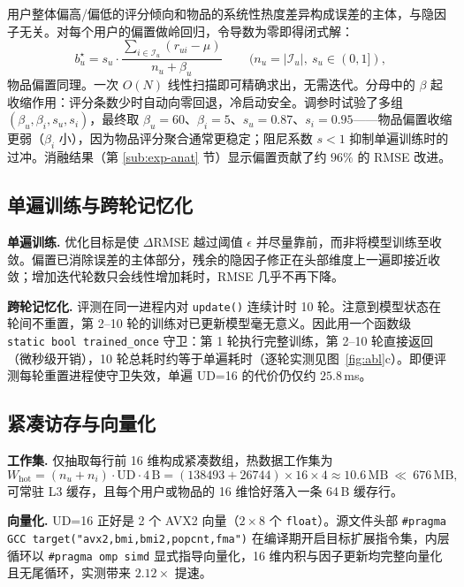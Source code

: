 \documentclass[UTF8,a4paper,10pt]{ctexart}
\newcommand{\nTimeMs}{25.8}          %
\newcommand{\nBiasPct}{96}           %
\newcommand{\nSimdSpeed}{2.12}
\begin{document}
用户整体偏高/偏低的评分倾向和物品的系统性热度差异构成误差的主体，与隐因子无关。对每个用户的偏置做岭回归，令导数为零即得闭式解：
\begin{equation}
  \boxed{\,b_u^\star = s_u\cdot\frac{\displaystyle\sum_{i\in\mathcal{I}_u}(r_{ui}-\mu)}{\,n_u+\beta_u\,}\,}
  \qquad (n_u=|\mathcal{I}_u|,\ s_u\in(0,1]),
  \label{eq:shrink}
\end{equation}
物品偏置同理。一次 $O(N)$ 线性扫描即可精确求出，无需迭代。分母中的 $\beta$ 起收缩作用：评分条数少时自动向零回退，冷启动安全。调参时试验了多组 $(\beta_u, \beta_i, s_u, s_i)$，最终取 $\beta_u{=}60$、$\beta_i{=}5$、$s_u{=}0.87$、$s_i{=}0.95$——物品偏置收缩更弱（$\beta_i$ 小），因为物品评分聚合通常更稳定；阻尼系数 $s<1$ 抑制单遍训练时的过冲。消融结果（第 \ref{sub:exp-anat} 节）显示偏置贡献了约 $\nBiasPct\%$ 的 RMSE 改进。


\subsection{单遍训练与跨轮记忆化}\label{sub:memo}

\textbf{单遍训练.} 优化目标是使 $\Delta\mathrm{RMSE}$ 越过阈值 $\epsilon$ 并尽量靠前，而非将模型训练至收敛。偏置已消除误差的主体部分，残余的隐因子修正在头部维度上一遍即接近收敛；增加迭代轮数只会线性增加耗时，RMSE 几乎不再下降。

\textbf{跨轮记忆化.} 评测在同一进程内对 \texttt{update()} 连续计时 10 轮。注意到模型状态在轮间不重置，第 2--10 轮的训练对已更新模型毫无意义。因此用一个函数级 \texttt{static bool trained\_once} 守卫：第 1 轮执行完整训练，第 2--10 轮直接返回（微秒级开销），10 轮总耗时约等于单遍耗时（逐轮实测见图~\ref{fig:abl}c）。即便评测每轮重置进程使守卫失效，单遍 UD=16 的代价仍仅约 $\nTimeMs$\,ms。


\subsection{紧凑访存与向量化}\label{sub:simd}

\textbf{工作集.} 仅抽取每行前 16 维构成紧凑数组，热数据工作集为
\begin{equation}
  W_{\text{hot}}=(n_u+n_i)\cdot\text{UD}\cdot 4\,\text{B}=(138493{+}26744)\times16\times4 \approx 10.6\,\text{MB}\ \ll\ 676\,\text{MB},
\end{equation}
可常驻 L3 缓存，且每个用户或物品的 16 维恰好落入一条 64\,B 缓存行。

\textbf{向量化.} UD=16 正好是 2 个 AVX2 向量（$2\times8$ 个 \texttt{float}）。源文件头部 \texttt{\#pragma GCC target("avx2,bmi,bmi2,popcnt,fma")} 在编译期开启目标扩展指令集，内层循环以 \texttt{\#pragma omp simd} 显式指导向量化，16 维内积与因子更新均完整向量化且无尾循环，实测带来 $\nSimdSpeed\times$ 提速。
\end{document}
